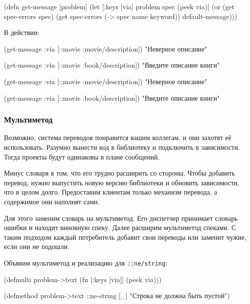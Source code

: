 \begin{clojure}
(defn get-message
  [problem]
  (let [{:keys [via]} problem
        spec (peek via)]
    (or (get spec-errors spec)
        (get spec-errors (-> spec name keyword))
        default-message)))
\end{clojure}


\fi

\noindent
В действии:

\ifnarrow

\begin{clojure}
(get-message
  {:via [::movie :movie/description]})
"Неверное описание"

(get-message
  {:via [::movie :book/description]})
"Введите описание книги"
\end{clojure}

\else

\begin{clojure}
(get-message {:via [::movie :movie/description]})
"Неверное описание"

(get-message {:via [::movie :book/description]})
"Введите описание книги"
\end{clojure}

\fi

\subsubsection*{Мультиметод}

Возможно, система переводов понравится вашим коллегам, и они захотят её
использовать. Разумно вынести код в библиотеку и подключить в зависимости. Тогда
проекты будут одинаковы в плане сообщений.

Минус словаря в том, что его трудно расширить со стороны. Чтобы добавить
перевод, нужно выпустить новую версию библиотеки и обновить зависимости, что в
целом долго. Предоставим клиентам только механизм перевода, а содержимое они
наполнят сами.

Для этого заменим словарь на мультиметод. Его диспетчер принимает словарь ошибки
и находит виновную спеку. Далее расширим мультиметод спеками. С таким подходом
каждый потребитель добавит свои переводы или заменит чужие, если они не подошли.

Объявим мультиметод и реализацию для \texttt{::ne\-/string}:


\begin{clojure}
(defmulti problem->text
  (fn [{:keys [via]}]
    (peek via)))

(defmethod problem->text ::ne-string [_]
  "Строка не должна быть пустой")
\end{clojure}

